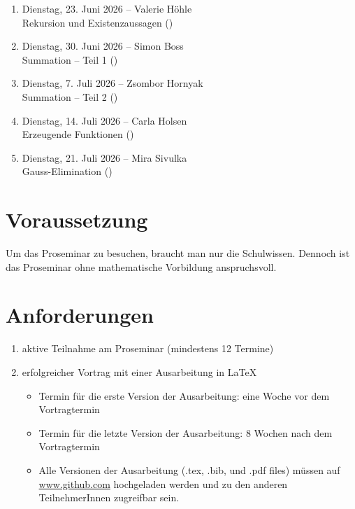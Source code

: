 \documentclass{article}
\begin{document}
\begin{enumerate}
    \item Dienstag, 23. Juni 2026 -- Valerie Höhle\\Rekursion und Existenzaussagen (\cite[Abschnitte 1.4--1.6]{aigner2006diskrete})
    \item Dienstag, 30. Juni 2026 -- Simon Boss\\Summation -- Teil 1 (\cite[Abschnitte 2.1--2.2]{aigner2006diskrete})
    \item Dienstag, 7. Juli 2026 -- Zsombor Hornyak\\Summation -- Teil 2 (\cite[Abschnitte 2.3--2.4]{aigner2006diskrete})
    \item Dienstag, 14. Juli 2026 -- Carla Holsen\\Erzeugende Funktionen (\cite[Kapitel 3]{aigner2006diskrete})
    \item Dienstag, 21. Juli 2026 -- Mira Sivulka\\ Gauss-Elimination (\cite[Kapitel 11]{hougardy2018algorithmische})
\end{enumerate}




\section{Voraussetzung} Um das Proseminar zu besuchen, braucht man nur die Schulwissen. Dennoch ist das Proseminar ohne mathematische Vorbildung anspruchsvoll.
\section{Anforderungen}
\begin{enumerate}
    \item aktive Teilnahme am Proseminar (mindestens 12 Termine)
    \item erfolgreicher Vortrag mit einer Ausarbeitung in \LaTeX
    \begin{itemize}
        \item Termin für die erste Version der Ausarbeitung: eine Woche vor dem Vortragtermin
        \item Termin für die letzte Version der Ausarbeitung: $8$ Wochen nach dem Vortragtermin
        \item Alle Versionen der Ausarbeitung (.tex, .bib, und .pdf files) müssen auf \url{www.github.com} hochgeladen   werden und zu den anderen TeilnehmerInnen zugreifbar sein.
    \end{itemize}
\end{enumerate}


\end{document}
